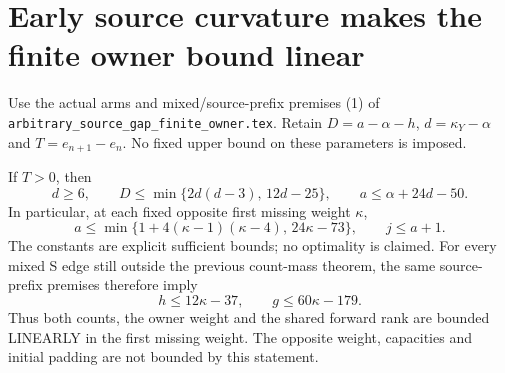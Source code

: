\section{Early source curvature makes the finite owner bound linear}
Use the actual arms and mixed/source-prefix premises (1) of
\texttt{arbitrary\_source\_gap\_finite\_owner.tex}.
Retain $D=a-\alpha-h$, $d=\kappa_Y-\alpha$ and
$T=e_{n+1}-e_n$. No fixed upper bound on these parameters is imposed.

\begin{theorem}
If $T>0$, then
\[
 \boxed{d\ge6,\qquad D\le\min\{2d(d-3),\,12d-25\},
       \qquad a\le\alpha+24d-50.}                    \tag{1}
\]
In particular, at each fixed opposite first missing weight $\kappa$,
\[
 \boxed{a\le\min\{1+4(\kappa-1)(\kappa-4),\,24\kappa-73\},
       \qquad j\le a+1.}                             \tag{2}
\]
The constants are explicit sufficient bounds; no optimality is claimed.
For every mixed S edge still outside the previous count-mass theorem,
the same source-prefix premises therefore imply
\[
                 h\le12\kappa-37,\qquad g\le60\kappa-179.       \tag{3}
\]
Thus both counts, the owner weight and the shared forward rank are
bounded LINEARLY in the first missing weight. The opposite weight,
capacities and initial padding are not bounded by this statement.
\end{theorem}

